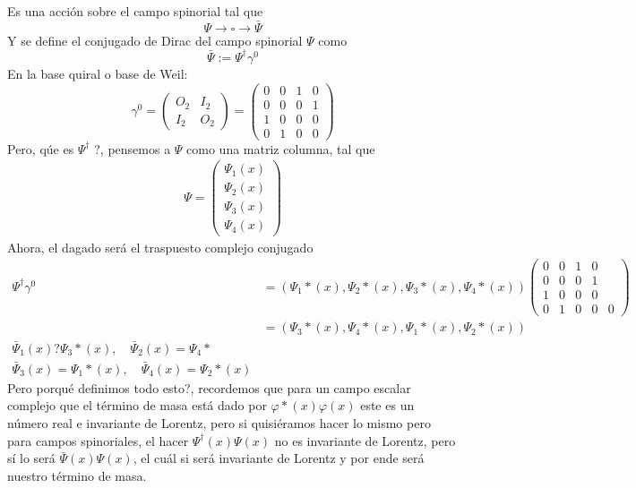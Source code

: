 \documentclass[../main.tex]{subfiles}
\begin{document}
  Es una acción sobre el campo spinorial tal que
  \begin{equation*}
    \Psi \rightarrow \square \rightarrow \bar{\Psi}
  \end{equation*}
Y se define el conjugado de Dirac del campo spinorial $\Psi$ como
\begin{equation}
  \bar{\Psi} := \Psi^\dagger \gamma^0
 \end{equation}
 En la base quiral o base de Weil:
 \begin{equation}
   \gamma^0 = \begin{pmatrix}
     O_2 & I_2 \\ I_2 & O_2
   \end{pmatrix} = \begin{pmatrix}
     0 & 0 & 1 & 0 \\ 0 & 0 & 0 & 1 \\ 1 & 0 & 0 & 0 \\ 0 & 1 & 0 & 0
   \end{pmatrix}
  \end{equation}
  Pero, qúe es $\Psi^\dagger$ ?, pensemos a $\Psi$ como una matriz columna, tal que
  \begin{align*}
    \Psi = \begin{pmatrix}
      \Psi_1(x) \\
      \Psi_2(x) \\
      \Psi_3(x) \\
      \Psi_4(x)
    \end{pmatrix}
  \end{align*}
  Ahora, el dagado será el traspuesto complejo conjugado
 \begin{align*}
   \Psi^\dagger \gamma^0 & = \left( \Psi_1*(x) , \Psi_2*(x) , \Psi_3*(x) , \Psi_4*(x) \right) \begin{pmatrix}
     0 & 0 & 1 & 0 \\ 0 & 0 & 0 & 1 \\ 1 & 0 & 0 & 0 \\ 0 & 1 & 0 & 0 & 0
   \end{pmatrix} \\
  & = \left( \Psi_3*(x) , \Psi_4*(x) , \Psi_1*(x) , \Psi_2*(x)\right) \\
   \bar{\Psi}_1(x) ? \Psi_3*(x) , \quad \bar{\Psi}_2(x) = \Psi_4* \\
   \bar{\Psi}_3(x) = \Psi_1*(x) , \quad \bar{\Psi}_4(x) = \Psi_2*(x)
 \end{align*} 
 Pero porqué definimos todo esto?, recordemos que para un campo escalar complejo que el término de masa está dado por $\varphi*(x) \varphi(x)$ este es un número real e invariante de Lorentz, pero si quisiéramos hacer lo mismo pero para campos spinoriales, el hacer $\Psi^\dagger(x)\Psi(x)$ no es invariante de Lorentz, pero sí lo será $\bar{\Psi}(x)\Psi(x)$, el cuál si será invariante de Lorentz y por ende será nuestro término de masa. \\
\end{document}
